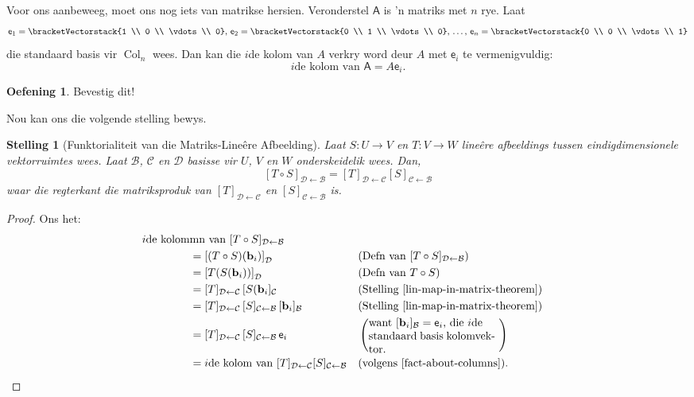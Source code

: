 \documentclass[a4paper,11pt]{book}
\newtheorem{theorem}{Stelling}
\theoremstyle{definition}
\newtheorem{exercise}{Oefening}
\newcommand{\be}{\begin{equation}}
\newcommand{\ee}{\end{equation}}
\newcommand{\ve}[1]{\mathbf{#1}}
\newcommand{\mat}[1]{\mathsf{#1}}
\newcommand{\basis}[1]{{\mathcal #1}}
\newcommand{\cvector}[1]{\bracketVectorstack{#1}}
\DeclareMathOperator{\Col}{Col}
\begin{document}
Voor ons aanbeweeg, moet ons nog iets van matrikse hersien. Veronderstel
$\mat{A}$ is 'n matriks met $n$ rye. Laat
\[
	\mat{e}_1 = \cvector{1 \\ 0 \\ \vdots \\ 0}, \, \mat{e}_2 = \cvector{0
	\\ 1 \\ \vdots \\ 0}, \, \ldots, \, \mat{e}_n = \cvector{0 \\ 0 \\
	\vdots \\ 1} 
\]
die standaard basis vir $\Col_n$ wees. Dan kan die $i$de kolom van $A$
verkry word deur $A$ met $\mat{e}_i$ te vermenigvuldig:
\be \label{fact-about-columns}
	\mbox{$i$de kolom van $\mat{A}$} = A \mat{e}_i.
\ee
\begin{exercise} \label{fact_about_columns_of_matrix}Bevestig dit!
\end{exercise}
Nou kan ons die volgende stelling bewys.
\begin{theorem}[Funktorialiteit van die Matriks-Line{\^e}re Afbeelding]
	\label{functoriality_of_matrix} Laat $S : U \rightarrow V$ en $T : V
	\rightarrow W$ line{\^e}re afbeeldings tussen eindigdimensionele
	vektorruimtes wees. Laat $\basis{B}$, $\basis{C}$ en $\basis{D}$
	basisse vir $U$, $V$ en $W$ onderskeidelik wees. Dan, 
	\[
		[T \circ S]_{\basis{D} \leftarrow \basis{B}} = [T]_{\basis{D}
		\leftarrow \basis{C}} [S]_{\basis{C} \leftarrow \basis{B}}
	\]
	waar die regterkant die matriksproduk van $[T]_{\basis{D} \leftarrow
	\basis{C}}$ en $[S]_{\basis{C} \leftarrow \basis{B}}$ is.
\end{theorem}
\begin{proof} Ons het:
	\begin{align*}
		\mbox{$i$de kolom}&\mbox{mn van $[T \circ S]_{\basis{D} \leftarrow
		\basis{B}}$} \\
		&= \left[(T \circ S)(\ve{b}_i)\right]_\basis{D} && \mbox{(Defn van
		$[T \circ S]_{\basis{D} \leftarrow \basis{B}}$)} \\
		&= \left[T(S(\ve{b}_i))\right]_\basis{D} && \mbox{(Defn van $T
		\circ S$)} \\ 
		&= [T]_{\basis{D} \leftarrow \basis{C}} \, [S(\ve{b}_i]_\basis{C}
		&& \mbox{(Stelling \ref{lin-map-in-matrix-theorem})} \\
		&= [T]_{\basis{D} \leftarrow \basis{C}} \, [S]_{\basis{C}
		\leftarrow \basis{B}} \, [\ve{b}_i]_\basis{B} && \mbox{(Stelling
		\ref{lin-map-in-matrix-theorem})} \\
		&= [T]_{\basis{D} \leftarrow \basis{C}} \, [S]_{\basis{C}
		\leftarrow \basis{B}} \, \mat{e}_i &&
		\left(\mbox{\begin{minipage}{4cm}
			want $[\ve{b}_i]_\basis{B} = \mat{e}_i$, die $i$de \\
			standaard basis kolomvektor.
		\end{minipage} } \right) \\
		&= \mbox{$i$de kolom van $[T]_{\basis{D} \leftarrow \basis{C}}
		[S]_{\basis{C} \leftarrow \basis{B}}$} && \mbox{(volgens
		\eqref{fact-about-columns})}.
	\end{align*}
\end{proof}
\end{document}
